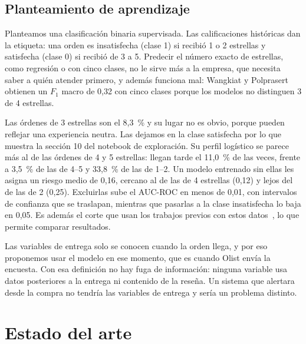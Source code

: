 \documentclass[journal]{IEEEtran}
\begin{document}
\subsection{Planteamiento de aprendizaje}

Planteamos una clasificación binaria supervisada. Las calificaciones históricas dan la etiqueta: una orden es insatisfecha (clase 1) si recibió 1 o 2 estrellas y satisfecha (clase 0) si recibió de 3 a 5. Predecir el número exacto de estrellas, como regresión o con cinco clases, no le sirve más a la empresa, que necesita saber a quién atender primero, y además funciona mal: Wangkiat y Polprasert~\cite{wangkiat2023} obtienen un $F_1$ macro de 0,32 con cinco clases porque los modelos no distinguen 3 de 4 estrellas.

Las órdenes de 3 estrellas son el 8,3~\% y su lugar no es obvio, porque pueden reflejar una experiencia neutra. Las dejamos en la clase satisfecha por lo que muestra la sección 10 del notebook de exploración. Su perfil logístico se parece más al de las órdenes de 4 y 5 estrellas: llegan tarde el 11,0~\% de las veces, frente a 3,5~\% de las de 4--5 y 33,8~\% de las de 1--2. Un modelo entrenado sin ellas les asigna un riesgo medio de 0,16, cercano al de las de 4 estrellas (0,12) y lejos del de las de 2 (0,25). Excluirlas sube el AUC-ROC en menos de 0,01, con intervalos de confianza que se traslapan, mientras que pasarlas a la clase insatisfecha lo baja en 0,05. Es además el corte que usan los trabajos previos con estos datos~\cite{wong2020,zaghloul2024,orman2026}, lo que permite comparar resultados.

Las variables de entrega solo se conocen cuando la orden llega, y por eso proponemos usar el modelo en ese momento, que es cuando Olist envía la encuesta. Con esa definición no hay fuga de información: ninguna variable usa datos posteriores a la entrega ni contenido de la reseña. Un sistema que alertara desde la compra no tendría las variables de entrega y sería un problema distinto.

\section{Estado del arte}
\end{document}
